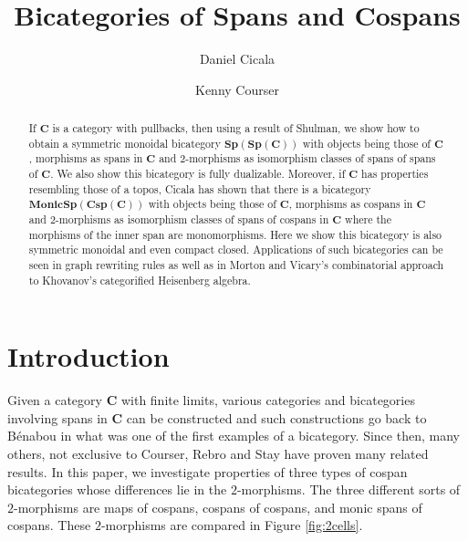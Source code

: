 \documentclass[11pt]{amsart}
\newcommand{\cat}[1]{\mathbf{#1}}
\theoremstyle{remark}
\theoremstyle{definition}
\begin{document}
\sloppy	

\begin{abstract}
If $\cat{C}$ is a category with pullbacks, then using a result of Shulman, we show how to obtain a symmetric monoidal bicategory $\cat{Sp(Sp(C))}$ with objects being those of $\cat{C}$, morphisms as spans in $\cat{C}$ and 2-morphisms as isomorphism classes of spans of spans of $\cat{C}$. We also show this bicategory is fully dualizable. Moreover, if $\cat{C}$ has properties resembling those of a topos, Cicala has shown that there is a bicategory $\cat{MonicSp(Csp(C))}$ with objects being those of $\cat{C}$, morphisms as cospans in $\cat{C}$ and 2-morphisms as isomorphism classes of spans of cospans in $\cat{C}$ where the morphisms of the inner span are monomorphisms. Here we show this bicategory is also symmetric monoidal and even compact closed. Applications of such bicategories can be seen in graph rewriting rules as well as in Morton and Vicary's combinatorial approach to Khovanov's categorified Heisenberg algebra.
\end{abstract}

\title{Bicategories of Spans and Cospans}
\author{Daniel Cicala \and Kenny Courser}
\maketitle

\section{Introduction} 
\label{sec:Introduction}

Given a category $\cat{C}$ with finite limits, various categories and bicategories involving spans in $\cat{C}$ can be constructed and such constructions go back to B\'enabou \cite{Be} in what was one of the first examples of a bicategory. Since then, many others, not exclusive to Courser, Rebro and Stay \cite{Cour,Reb,Stay} have proven many related results. In this paper, we investigate properties of three types of cospan bicategories whose differences lie in the $2$-morphisms.  The three different sorts of $2$-morphisms are maps of cospans, cospans of cospans, and monic spans of cospans.  These $2$-morphisms are compared in Figure \ref{fig:2cells}. 
\end{document}
